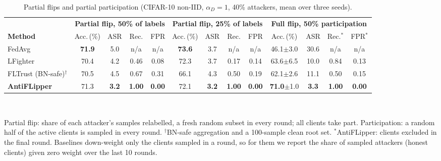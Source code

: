 \begin{table}[t]
\centering
\caption{Partial flips and partial participation (CIFAR-10 non-IID, $\alpha_D{=}1$, 40\% attackers, mean over three seeds).}
\label{tab:partial}
\footnotesize
\setlength{\tabcolsep}{3.4pt}
\begin{tabular}{@{}l cccc cccc cccc@{}}
\toprule
& \multicolumn{4}{c}{\textbf{Partial flip, 50\% of labels}} & \multicolumn{4}{c}{\textbf{Partial flip, 25\% of labels}} & \multicolumn{4}{c}{\textbf{Full flip, 50\% participation}} \\
\cmidrule(lr){2-5}\cmidrule(lr){6-9}\cmidrule(l){10-13}
\textbf{Method} & Acc.\,(\%) & ASR & Rec. & FPR & Acc.\,(\%) & ASR & Rec. & FPR & Acc.\,(\%) & ASR & Rec.$^{*}$ & FPR$^{*}$ \\
\midrule
FedAvg & \textbf{71.9} & 5.0 & n/a & n/a & \textbf{73.6} & 3.7 & n/a & n/a & 46.1{\scriptsize$\pm$3.0} & 30.6 & n/a & n/a \\
LFighter & 70.4 & 4.2 & 0.46 & 0.08 & 72.3 & 3.7 & 0.17 & 0.14 & 63.6{\scriptsize$\pm$6.5} & 10.0 & 0.84 & 0.13 \\
FLTrust (BN-safe)$^{\dagger}$ & 70.5 & 4.5 & 0.67 & 0.31 & 66.1 & 4.3 & 0.50 & 0.19 & 62.1{\scriptsize$\pm$2.6} & 11.1 & 0.50 & 0.15 \\
\midrule
\textbf{AntiFLipper} & 71.3 & \textbf{3.2} & \textbf{1.00} & \textbf{0.00} & 72.1 & \textbf{3.2} & \textbf{1.00} & \textbf{0.00} & \textbf{71.0}{\scriptsize$\pm$1.0} & \textbf{3.3} & \textbf{1.00} & \textbf{0.00} \\
\bottomrule
\end{tabular}
\\[2pt]\parbox{\linewidth}{\scriptsize Partial flip: share of each attacker's samples relabelled, a fresh random subset in every round; all clients take part. Participation: a random half of the active clients is sampled in every round. $^{\dagger}$BN-safe aggregation and a 100-sample clean root set. $^{*}$AntiFLipper: clients excluded in the final round. Baselines down-weight only the clients sampled in a round, so for them we report the share of sampled attackers (honest clients) given zero weight over the last 10 rounds.}
\end{table}
